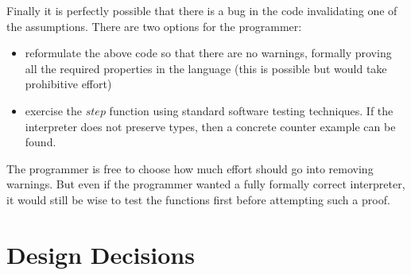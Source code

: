 Finally it is perfectly possible that there is a bug in the code invalidating one of the assumptions.
There are two options for the programmer:
\begin{itemize}
\item reformulate the above code so that there are no warnings, formally proving all the required properties in the language (this is possible but would take prohibitive effort)
\item exercise the $step$ function using standard software testing techniques.
If the interpreter does not preserve types, then a concrete counter example can be found.
\end{itemize}
The programmer is free to choose how much effort should go into removing warnings.
But even if the programmer wanted a fully formally correct interpreter, it would still be wise to test the functions first before attempting such a proof.



\section{Design Decisions}


